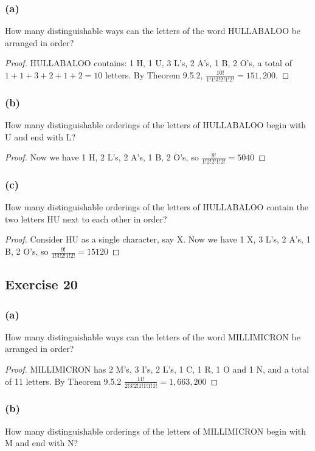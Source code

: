 \documentclass[14pt]{extarticle}
\begin{document}
\subsubsection{(a)}
How many distinguishable ways can the letters of the word HULLABALOO be arranged in order?

\begin{proof}
HULLABALOO contains: 1 H, 1 U, 3 L's, 2 A's, 1 B, 2 O's, a total of \(1+1+3+2+1+2 = 10\) letters. By Theorem 9.5.2,
\(\frac{10!}{1!1!3!2!1!2!} = 151,200\).
\end{proof}

\subsubsection{(b)}
How many distinguishable orderings of the letters of HULLABALOO begin with U and end with L?

\begin{proof}
Now we have 1 H, 2 L's, 2 A's, 1 B, 2 O's, so \(\frac{8!}{1!2!2!1!2!} = 5040\)
\end{proof}

\subsubsection{(c)}
How many distinguishable orderings of the letters of HULLABALOO contain the two letters HU next to each other in 
order?

\begin{proof}
Consider HU as a single character, say X. Now we have 1 X, 3 L's, 2 A's, 1 B, 2 O's, so \(\frac{9!}{1!3!2!1!2!} = 15120\)
\end{proof}

\subsection{Exercise 20}
\subsubsection{(a)}
How many distinguishable ways can the letters of the word MILLIMICRON be arranged in order?

\begin{proof}
MILLIMICRON has 2 M's, 3 I's, 2 L's, 1 C, 1 R, 1 O and 1 N, and a total of 11 letters. By Theorem 9.5.2 
\(\frac{11!}{2!3!2!1!1!1!1!} = 1,663,200\)
\end{proof}

\subsubsection{(b)}
How many distinguishable orderings of the letters of MILLIMICRON begin with M and end with N?
\end{document}
